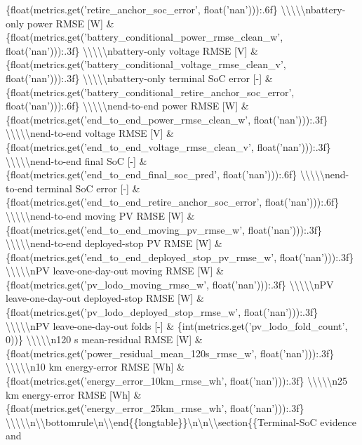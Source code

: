 \documentclass[a4paper,11pt]{article}
\begin{document}
\begin{enumerate}[leftmargin=1.8em]
\{float(metrics.get('retire\_anchor\_soc\_error', float('nan'))):.6f\} \textbackslash{}\textbackslash{}\textbackslash{}\textbackslash{}\textbackslash{}nbattery-only power RMSE [W] \& \{float(metrics.get('battery\_conditional\_power\_rmse\_clean\_w', float('nan'))):.3f\} \textbackslash{}\textbackslash{}\textbackslash{}\textbackslash{}\textbackslash{}nbattery-only voltage RMSE [V] \& \{float(metrics.get('battery\_conditional\_voltage\_rmse\_clean\_v', float('nan'))):.3f\} \textbackslash{}\textbackslash{}\textbackslash{}\textbackslash{}\textbackslash{}nbattery-only terminal SoC error [-] \& \{float(metrics.get('battery\_conditional\_retire\_anchor\_soc\_error', float('nan'))):.6f\} \textbackslash{}\textbackslash{}\textbackslash{}\textbackslash{}\textbackslash{}nend-to-end power RMSE [W] \& \{float(metrics.get('end\_to\_end\_power\_rmse\_clean\_w', float('nan'))):.3f\} \textbackslash{}\textbackslash{}\textbackslash{}\textbackslash{}\textbackslash{}nend-to-end voltage RMSE [V] \& \{float(metrics.get('end\_to\_end\_voltage\_rmse\_clean\_v', float('nan'))):.3f\} \textbackslash{}\textbackslash{}\textbackslash{}\textbackslash{}\textbackslash{}nend-to-end final SoC [-] \& \{float(metrics.get('end\_to\_end\_final\_soc\_pred', float('nan'))):.6f\} \textbackslash{}\textbackslash{}\textbackslash{}\textbackslash{}\textbackslash{}nend-to-end terminal SoC error [-] \& \{float(metrics.get('end\_to\_end\_retire\_anchor\_soc\_error', float('nan'))):.6f\} \textbackslash{}\textbackslash{}\textbackslash{}\textbackslash{}\textbackslash{}nend-to-end moving PV RMSE [W] \& \{float(metrics.get('end\_to\_end\_moving\_pv\_rmse\_w', float('nan'))):.3f\} \textbackslash{}\textbackslash{}\textbackslash{}\textbackslash{}\textbackslash{}nend-to-end deployed-stop PV RMSE [W] \& \{float(metrics.get('end\_to\_end\_deployed\_stop\_pv\_rmse\_w', float('nan'))):.3f\} \textbackslash{}\textbackslash{}\textbackslash{}\textbackslash{}\textbackslash{}nPV leave-one-day-out moving RMSE [W] \& \{float(metrics.get('pv\_lodo\_moving\_rmse\_w', float('nan'))):.3f\} \textbackslash{}\textbackslash{}\textbackslash{}\textbackslash{}\textbackslash{}nPV leave-one-day-out deployed-stop RMSE [W] \& \{float(metrics.get('pv\_lodo\_deployed\_stop\_rmse\_w', float('nan'))):.3f\} \textbackslash{}\textbackslash{}\textbackslash{}\textbackslash{}\textbackslash{}nPV leave-one-day-out folds [-] \& \{int(metrics.get('pv\_lodo\_fold\_count', 0))\} \textbackslash{}\textbackslash{}\textbackslash{}\textbackslash{}\textbackslash{}n120 s mean-residual RMSE [W] \& \{float(metrics.get('power\_residual\_mean\_120s\_rmse\_w', float('nan'))):.3f\} \textbackslash{}\textbackslash{}\textbackslash{}\textbackslash{}\textbackslash{}n10 km energy-error RMSE [Wh] \& \{float(metrics.get('energy\_error\_10km\_rmse\_wh', float('nan'))):.3f\} \textbackslash{}\textbackslash{}\textbackslash{}\textbackslash{}\textbackslash{}n25 km energy-error RMSE [Wh] \& \{float(metrics.get('energy\_error\_25km\_rmse\_wh', float('nan'))):.3f\} \textbackslash{}\textbackslash{}\textbackslash{}\textbackslash{}\textbackslash{}n\textbackslash{}\textbackslash{}bottomrule\textbackslash{}n\textbackslash{}\textbackslash{}end\{\{longtable\}\}\textbackslash{}n\textbackslash{}n\textbackslash{}\textbackslash{}section\{\{Terminal-SoC evidence and 
\end{enumerate}
\end{document}
